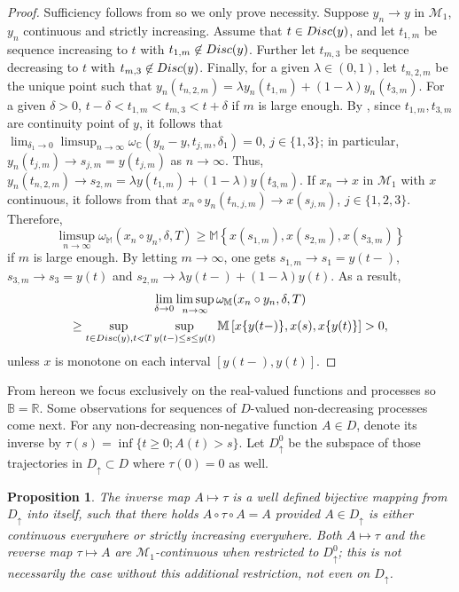 \documentclass[final]{amsart}
\newtheorem{prop}[thm]{Proposition}
\theoremstyle{definition}
\numberwithin{equation}{section}
\def\disp{\displaystyle}
\newcommand{\dB}{\ensuremath{\mathbb{B}}}
\newcommand{\dC}{\ensuremath{\mathbb{C}}}
\newcommand{\dM}{\ensuremath{\mathbb{M}}}
\newcommand{\dR}{\ensuremath{\mathbb{R}}}
\newcommand{\cM}{\ensuremath{\mathcal{M}}}
\begin{document}
\begin{proof} Sufficiency follows from \citet[Theorem 13.2.4]{Whitt:2002} so we only prove necessity.
Suppose $y_n \to y$ in $\cM_1$, $y_n$ continuous and strictly increasing.  Assume that $t\in {\rm Disc}(y)$, and let $t_{1,m}$ be sequence increasing to $t$ with $t_{1,m} \not \in {\rm Disc}(y)$.
Further let  $t_{m,3}$ be sequence decreasing to $t$ with $t_{m,3} \not \in {\rm Disc}(y)$. Finally, for a given $\lambda \in (0,1)$, let $t_{n,2,m}$ be the unique point such that
$y_n(t_{n,2,m}) = \lambda y_n(t_{1,m})+(1-\lambda)y_n(t_{3,m})$. For a given $\delta>0$, $t-\delta < t_{1,m} < t_{m,3} < t+\delta$ if $m$ is large enough. By \cite[Theorem 12.5.1 (v)]{Whitt:2002}, since $t_{1,m},t_{3,m}$ are continuity point of $y$, it follows that
$\disp \lim_{\delta_1\to 0}\limsup_{n\to\infty}\omega_\dC(y_n-y,t_{j,m},\delta_1) = 0$, $j\in\{1,3\}$;
in particular, $y_n(t_{j,m})\to s_{j,m} = y(t_{j,m})$ as $n\to\infty$.
Thus, $y_n(t_{n,2,m}) \to s_{2,m} = \lambda y(t_{1,m})+(1-\lambda)y(t_{3,m})$. If $x_n\to x$ in $\cM_1$ with $x$ continuous,
it follows from \cite[Theorem 12.5.1 (v)]{Whitt:2002} that $x_n\circ y_n(t_{n,j,m})\to x(s_{j,m})$, $j\in\{1,2,3\}$. Therefore,
$$
\limsup_{n\to\infty}\omega_\dM(x_n\circ y_n,\delta,T)\ge
\dM\left\{x(s_{1,m}),x(s_{2,m}),x(s_{3,m})\right\}
$$
if $m$ is large enough. By letting $m\to\infty$, one gets $s_{1,m}\to s_1 = y(t-)$, $s_{3,m}\to s_3 = y(t)$ and $s_{2,m}\to \lambda y(t-)+ (1-\lambda)y(t)$.  As  a result,
\begin{multline*}
\lim_{\delta \to 0} \limsup_{n\to\infty}\omega_\dM(x_n\circ y_n,\delta,T) \\
 \ge  \sup_{t\in {\rm Disc}(y), t <T}\sup_{y(t-)  \le s \le y(t)}\dM\left[x\{y(t-)\},x(s),x\{y(t)\}\right]>0,
\end{multline*}
unless $x$ is monotone on each interval $[y(t-),y(t)]$.
\end{proof}

From hereon we focus exclusively on the real-valued functions and processes so $\dB=\dR$.
Some observations for sequences of $D$-valued non-decreasing processes come next.
For any non-decreasing non-negative function $A\in D$, denote its inverse by $\tau(s) = \inf\{t\ge0; A(t)>s\}$.
Let $D_{\uparrow}^0$ be the subspace of those trajectories in $D_{\uparrow}\subset D$ where $\tau(0)=0$ as well.

\begin{prop}\label{prop:inversecontinuity}
The inverse map $A\mapsto\tau$ is a well defined bijective mapping from $D_{\uparrow}$ into itself, such that there holds
$A\circ\tau\circ A=A$ provided $A\in D_{\uparrow}$ is either continuous everywhere or strictly increasing everywhere.
Both $A\mapsto\tau$ and the reverse map $\tau\mapsto A$ are $\mathcal{M}_1$-continuous
when restricted to $D_{\uparrow}^0$; this is not necessarily the case without this additional restriction, not even on $D_{\uparrow}$.
\end{prop}
\end{document}
